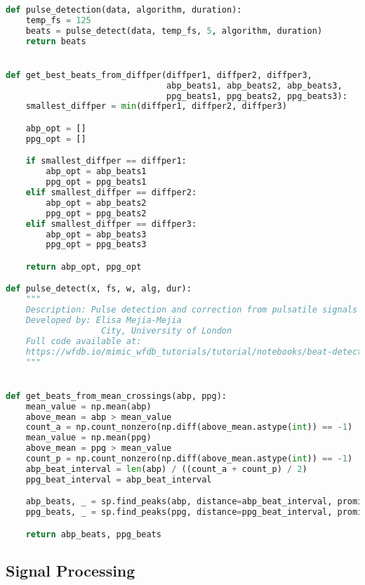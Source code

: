 \begin{lstlisting}[language=Python,label={lst:beats.py}, basicstyle=\scriptsize]
def pulse_detection(data, algorithm, duration):
    temp_fs = 125
    beats = pulse_detect(data, temp_fs, 5, algorithm, duration)
    return beats


def get_best_beats_from_diffper(diffper1, diffper2, diffper3,
                                abp_beats1, abp_beats2, abp_beats3,
                                ppg_beats1, ppg_beats2, ppg_beats3):
    smallest_diffper = min(diffper1, diffper2, diffper3)

    abp_opt = []
    ppg_opt = []

    if smallest_diffper == diffper1:
        abp_opt = abp_beats1
        ppg_opt = ppg_beats1
    elif smallest_diffper == diffper2:
        abp_opt = abp_beats2
        ppg_opt = ppg_beats2
    elif smallest_diffper == diffper3:
        abp_opt = abp_beats3
        ppg_opt = ppg_beats3

    return abp_opt, ppg_opt

def pulse_detect(x, fs, w, alg, dur):
    """
    Description: Pulse detection and correction from pulsatile signals
    Developed by: Elisa Mejia-Mejia
                   City, University of London
    Full code available at:
    https://wfdb.io/mimic_wfdb_tutorials/tutorial/notebooks/beat-detection.html
    """


def get_beats_from_mean_crossings(abp, ppg):
    mean_value = np.mean(abp)
    above_mean = abp > mean_value
    count_a = np.count_nonzero(np.diff(above_mean.astype(int)) == -1)
    mean_value = np.mean(ppg)
    above_mean = ppg > mean_value
    count_p = np.count_nonzero(np.diff(above_mean.astype(int)) == -1)
    abp_beat_interval = len(abp) / ((count_a + count_p) / 2)
    ppg_beat_interval = abp_beat_interval

    abp_beats, _ = sp.find_peaks(abp, distance=abp_beat_interval, prominence=5)
    ppg_beats, _ = sp.find_peaks(ppg, distance=ppg_beat_interval, prominence=0.01)

    return abp_beats, ppg_beats

\end{lstlisting}

\subsection{Signal Processing}
\label{subsec:code_sp}

